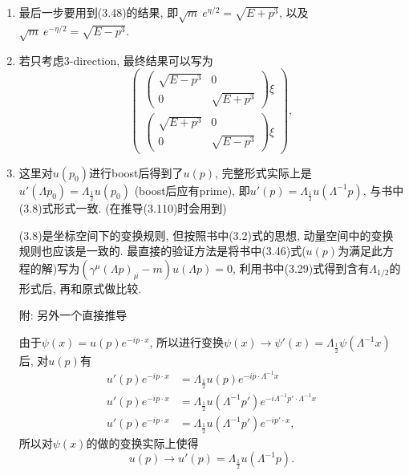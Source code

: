 \documentclass[cn,hazy,green,11pt,device=normal,chinesefont=founder]{elegantnote}
\begin{document}
\begin{enumerate}
  \item 最后一步要用到(3.48)的结果, 即$\sqrt{m}\ e^{\eta/2} = \sqrt{E + p^3}$, 以及$\sqrt{m}\ e^{-\eta/2} = \sqrt{E - p^3}$. 
  \item 若只考虑3-direction, 最终结果可以写为
  \begin{equation}
    \left( \begin{array}{c} \left( \begin{array}{cc} \sqrt{E-p^3} & 0 \\ 0 & \sqrt{E+p^3} \end{array} \right)\xi \\ \left( \begin{array}{cc} \sqrt{E+p^3} & 0 \\ 0 & \sqrt{E-p^3} \end{array} \right)\xi \end{array} \right), 
  \end{equation}
  \item 这里对$u(p_0)$进行boost后得到了$u(p)$, 完整形式实际上是$u'(\Lambda p_0) = \Lambda_{\frac{1}{2}}u(p_0)$ (boost后应有prime), 即$u'(p) = \Lambda_{\frac{1}{2}}u(\Lambda^{-1}p)$, 与书中(3.8)式形式一致. (在推导(3.110)时会用到)
  \begin{note}
    (3.8)是坐标空间下的变换规则, 但按照书中(3.2)式的思想, 动量空间中的变换规则也应该是一致的. 最直接的验证方法是将书中(3.46)式($u(p)$为满足此方程的解)写为$(\gamma^\mu(\Lambda p)_\mu - m)u(\Lambda p) = 0$, 利用书中(3.29)式得到含有$\Lambda_{1/2}$的形式后, 再和原式做比较. 

    \mbox{}

    附: 另外一个直接推导

    由于$\psi(x) = u(p)e^{-ip\cdot x}$, 所以进行变换$\psi(x) \rightarrow \psi'(x) = \Lambda_{\frac{1}{2}}\psi(\Lambda^{-1}x)$后, 对$u(p)$有
    \begin{equation}
      \begin{aligned}
        u'(p)e^{-ip\cdot x} &= \Lambda_{\frac{1}{2}}u(p)e^{-ip\cdot \Lambda^{-1}x} \\
        u'(p)e^{-ip\cdot x} &= \Lambda_{\frac{1}{2}}u(\Lambda^{-1}p')e^{-i\Lambda^{-1}p'\cdot \Lambda^{-1}x} \\
        u'(p)e^{-ip\cdot x} &= \Lambda_{\frac{1}{2}}u(\Lambda^{-1}p')e^{-ip'\cdot x}, 
      \end{aligned}
    \end{equation}
    所以对$\psi(x)$的做的变换实际上使得
    \begin{equation}
      u(p) \rightarrow u'(p) = \Lambda_{\frac{1}{2}}u(\Lambda^{-1}p). 
    \end{equation}
  \end{note}
\end{enumerate}
\end{document}
